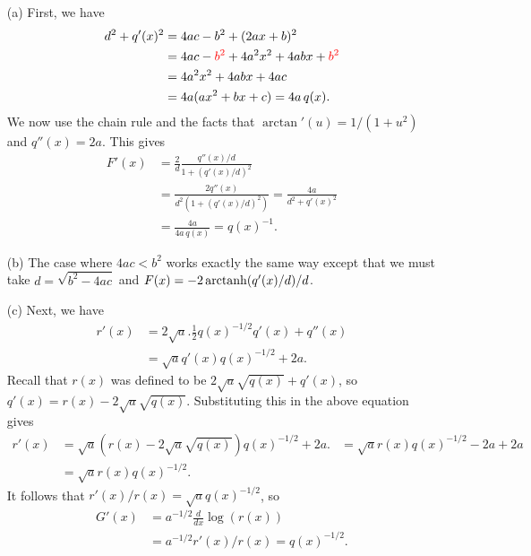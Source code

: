 \documentclass[a4paper]{book}
\theoremstyle{definition}
\renewenvironment{solution}{\SolutionInline}{\endSolutionInline}
\begin{document}
\begin{solution}
 \begin{itemize}
  \item[(a)] First, we have
   \begin{align*}
    d^2 + q'(x)^2 &= 4ac-b^2 + (2ax+b)^2 \\
                  &= 4ac - {\color{red}b^2} + 4a^2x^2 + 4abx + {\color{red}b^2} \\
                  &= 4a^2x^2 + 4abx + 4ac \\
                  &= 4a(ax^2+bx+c) = 4a\, q(x).
   \end{align*}
   We now use the chain rule and the facts that
   $\arctan'(u)=1/(1+u^2)$ and $q''(x)=2a$.  This gives
   \begin{align*}
    F'(x) &= \frac{2}{d} \frac{q''(x)/d}{1+(q'(x)/d)^2} \\
          &= \frac{2q''(x)}{d^2(1+(q'(x)/d)^2)}
           = \frac{4a}{d^2+q'(x)^2} \\
          &= \frac{4a}{4a\,q(x)} = q(x)^{-1}.
   \end{align*}
  \item[(b)] The case where $4ac<b^2$ works exactly the same way
   except that we must take $d=\sqrt{b^2-4ac}$ and
   $F(x)=-2\operatorname{arctanh}(q'(x)/d)/d$.
  \item[(c)] Next, we have
   \begin{align*}
    r'(x) &= 2\sqrt{a}.\frac{1}{2}q(x)^{-1/2}q'(x) + q''(x) \\
          &= \sqrt{a}q'(x)q(x)^{-1/2} + 2a.
   \end{align*}
   Recall that $r(x)$ was defined to be $2\sqrt{a}\sqrt{q(x)}+q'(x)$,
   so $q'(x)=r(x)-2\sqrt{a}\sqrt{q(x)}$.  Substituting this in the
   above equation gives
   \begin{align*}
    r'(x) &= \sqrt{a}(r(x)-2\sqrt{a}\sqrt{q(x)})q(x)^{-1/2} + 2a.
          &= \sqrt{a}r(x)q(x)^{-1/2} - 2a + 2a \\
          &= \sqrt{a}r(x)q(x)^{-1/2}.
   \end{align*}
   It follows that $r'(x)/r(x)=\sqrt{a} q(x)^{-1/2}$, so 
   \begin{align*}
    G'(x) &= a^{-1/2}\frac{d}{dx}\log(r(x)) \\
          &= a^{-1/2} r'(x)/r(x) = q(x)^{-1/2}.
   \end{align*}
 \end{itemize}
\end{solution}
\end{document}
